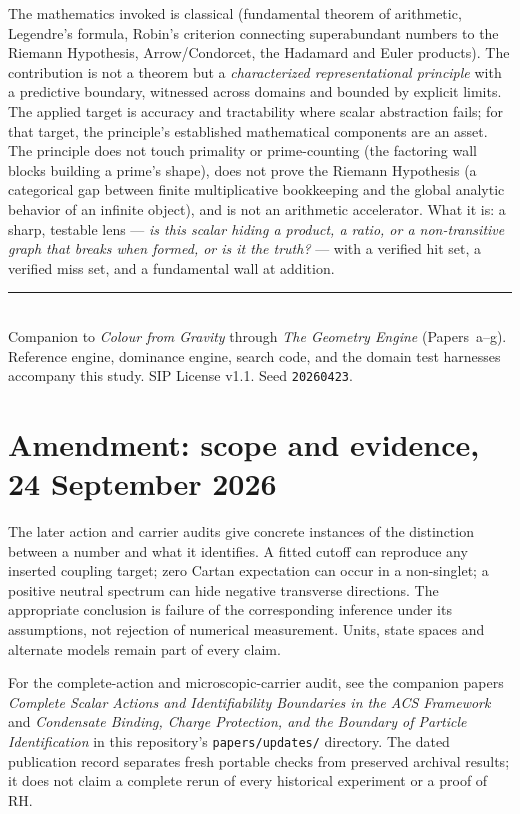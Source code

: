\documentclass[11pt]{article}
\begin{document}
The mathematics invoked is classical (fundamental theorem of arithmetic, Legendre's formula, Robin's
criterion connecting superabundant numbers to the Riemann Hypothesis, Arrow/Condorcet, the Hadamard and
Euler products). The contribution is not a theorem but a \emph{characterized representational principle}
with a predictive boundary, witnessed across domains and bounded by explicit limits. The applied target is
accuracy and tractability where scalar abstraction fails; for that target, the principle's established
mathematical components are an asset. The principle does not touch primality or prime-counting (the factoring
wall blocks building a prime's shape), does not prove the Riemann Hypothesis (a categorical gap between finite
multiplicative bookkeeping and the global analytic behavior of an infinite object), and is not an arithmetic
accelerator. What it is: a sharp, testable lens --- \emph{is this scalar hiding a product, a ratio, or a
non-transitive graph that breaks when formed, or is it the truth?} --- with a verified hit set, a verified
miss set, and a fundamental wall at addition.

\vspace{1em}\noindent\rule{\linewidth}{0.4pt}\\
\small Companion to \textit{Colour from Gravity} through \textit{The Geometry Engine} (Papers~a--g). Reference engine, dominance engine, search code, and the domain test
harnesses accompany this study. SIP License v1.1. Seed \texttt{20260423}.


\section*{Amendment: scope and evidence, 24 September 2026}
The later action and carrier audits give concrete instances of the distinction between a number and what it identifies. A fitted cutoff can reproduce any inserted coupling target; zero Cartan expectation can occur in a non-singlet; a positive neutral spectrum can hide negative transverse directions. The appropriate conclusion is failure of the corresponding inference under its assumptions, not rejection of numerical measurement. Units, state spaces and alternate models remain part of every claim.

For the complete-action and microscopic-carrier audit, see the companion
papers \emph{Complete Scalar Actions and Identifiability Boundaries in the ACS
Framework} and \emph{Condensate Binding, Charge Protection, and the Boundary
of Particle Identification} in this repository's \texttt{papers/updates/}
directory. The dated publication record separates fresh portable checks
from preserved archival results; it does not claim a complete rerun of every
historical experiment or a proof of RH.
\end{document}

